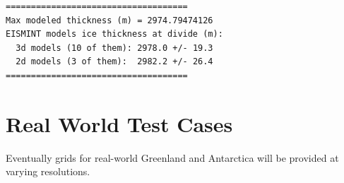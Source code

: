 \begin{verbatim}
====================================
Max modeled thickness (m) = 2974.79474126
EISMINT models ice thickness at divide (m):
  3d models (10 of them): 2978.0 +/- 19.3
  2d models (3 of them):  2982.2 +/- 26.4
====================================
\end{verbatim}



\section{Real World Test Cases}
Eventually grids for real-world Greenland and Antarctica will be provided at varying resolutions.


